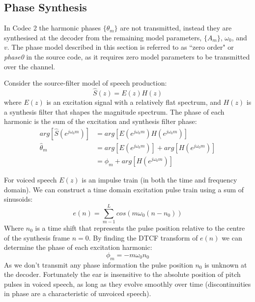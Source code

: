 \documentclass{article}
\begin{document}
\subsection{Phase Synthesis}

In Codec 2 the harmonic phases $\{\theta_m\}$ are not transmitted, instead they are synthesised at the decoder from the remaining model parameters, $\{A_m\}$, $\omega_0$, and $v$.  The phase model described in this section is referred to as ``zero order" or \emph{phase0} in the source code, as it requires zero model parameters to be transmitted over the channel.

Consider the source-filter model of speech production:
\begin{equation}
\hat{S}(z)=E(z)H(z)
\end{equation}
where $E(z)$ is an excitation signal with a relatively flat spectrum, and $H(z)$ is a synthesis filter that shapes the magnitude spectrum.  The phase of each harmonic is the sum of the excitation and synthesis filter phase:
\begin{equation}
\begin{split}
arg \left[ \hat{S}(e^{j \omega_0 m}) \right] &= arg \left[ E(e^{j \omega_0 m}) H(e^{j \omega_0 m}) \right] \\
\hat{\theta}_m &= arg \left[ E(e^{j \omega_0 m}) \right] + arg \left[ H(e^{j \omega_0 m}) \right] \\
&= \phi_m +  arg \left[ H(e^{j \omega_0 m}) \right]
\end{split}
\end{equation}

For voiced speech $E(z)$ is an impulse train (in both the time and frequency domain). We can construct a time domain excitation pulse train using a sum of sinusoids:
\begin{equation}
e(n) = \sum_{m-1}^L cos( m \omega_0 (n - n_0))
\end{equation}
Where $n_0$ is a time shift that represents the pulse position relative to the centre of the synthesis frame $n=0$. By finding the DTCF transform of $e(n)$ we can determine the phase of each excitation harmonic:
\begin{equation}
\phi_m = - m \omega_0 n_0
\end{equation}
As we don't transmit any phase information the pulse position $n_0$ is unknown at the decoder.  Fortunately the ear is insensitive to the absolute position of pitch pulses in voiced speech, as long as they evolve smoothly over time (discontinuities in phase are a characteristic of unvoiced speech).
\end{document}
